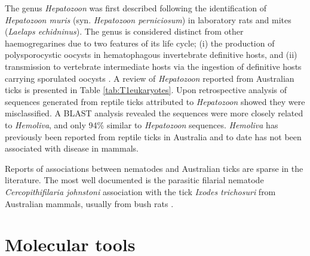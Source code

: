 \documentclass[a4paper, nobind]{templates/ociamthesis}
\begin{document}
The genus \emph{Hepatozoon} was first described following the identification of \emph{Hepatozoon muris} (syn. \emph{Hepatozoon perniciosum}) in laboratory rats and mites (\emph{Laelaps echidninus}).
The genus is considered distinct from other haemogregarines due to two features of its life cycle; (i) the production of polysporocystic oocysts in hematophagous invertebrate definitive hosts, and (ii) transmission to vertebrate intermediate hosts via the ingestion of definitive hosts carrying sporulated oocysts \autocite{smithGenusHepatozoonApicomplexa1996,mathewPHYLOGENETICRELATIONSHIPSHEPATOZOON2000}.
A review of \emph{Hepatozoon} reported from Australian ticks is presented in Table \ref{tab:T1eukaryotes}.
Upon retrospective analysis of sequences generated from reptile ticks attributed to \emph{Hepatozoon} \autocite{vilcinsMolecularMorphologicalDescription2009} showed they were misclassified.
A BLAST analysis revealed the sequences were more closely related to \emph{Hemoliva}, and only 94\% similar to \emph{Hepatozoon} sequences.
\emph{Hemoliva} has previously been reported from reptile ticks in Australia and to date has not been associated with disease in mammals.

Reports of associations between nematodes and Australian ticks are sparse in the literature. The most well documented is the parasitic filarial nematode \emph{Cercopithifilaria johnstoni} association with the tick \emph{Ixodes trichosuri} from Australian mammals, usually from bush rats \autocite{sprattAspectsLifeHistory1988a,mccannGenomeSequenceAustralian2021}.

\hypertarget{molecular-tools}{%
\section{Molecular tools}\label{molecular-tools}}
\end{document}
